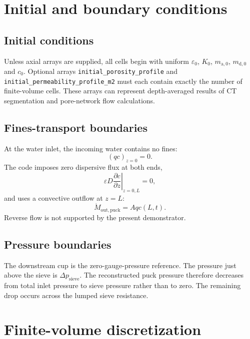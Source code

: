\documentclass[11pt,a4paper]{article}
\newcommand{\code}[1]{\texttt{#1}}
\begin{document}
\section{Initial and boundary conditions}

\subsection{Initial conditions}

Unless axial arrays are supplied, all cells begin with uniform
$\varepsilon_0$, $K_0$, $m_{\mathrm a,0}$, $m_{\mathrm d,0}$ and $c_0$.
Optional arrays 
\code{initial\_porosity\_profile} and
\code{initial\_permeability\_profile\_m2} must each contain exactly the number
of finite-volume cells. These arrays can represent depth-averaged results of CT
segmentation and pore-network flow calculations.

\subsection{Fines-transport boundaries}

At the water inlet, the incoming water contains no fines:
\begin{equation}
(qc)_{z=0}=0.
\end{equation}
The code imposes zero dispersive flux at both ends,
\begin{equation}
\left.\varepsilon D\frac{\partial c}{\partial z}\right|_{z=0,L}=0,
\end{equation}
and uses a convective outflow at $z=L$:
\begin{equation}
\dot M_{\mathrm{out,puck}}=Aq c(L,t).
\end{equation}
Reverse flow is not supported by the present demonstrator.

\subsection{Pressure boundaries}

The downstream cup is the zero-gauge-pressure reference. The pressure just
above the sieve is $\Delta p_{\mathrm{sieve}}$. The reconstructed puck pressure
therefore decreases from total inlet pressure to sieve pressure rather than to
zero. The remaining drop occurs across the lumped sieve resistance.

\section{Finite-volume discretization}
\end{document}
